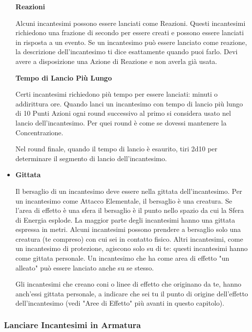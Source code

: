 \documentclass[12pt,a4paper,twoside,openany]{book}
\begin{document}
\begin{multicols}{2}
\begin{itemize}
\subitem \textbf{Reazioni}

Alcuni incantesimi possono essere lanciati come Reazioni. Questi incantesimi richiedono una frazione di secondo per essere creati e possono essere lanciati in risposta a un evento. Se un incantesimo può essere lanciato come reazione, la descrizione dell'incantesimo ti dice esattamente quando puoi farlo. Devi avere a disposizione una Azione di Reazione e non averla già usata.

\subitem \textbf{Tempo di Lancio Più Lungo}

Certi incantesimi richiedono più tempo per essere lanciati: minuti o addirittura ore. Quando lanci un incantesimo con tempo di lancio più lungo di 10 Punti Azioni ogni round successivo al primo si considera usato nel lancio dell'incantesimo. Per quei round è come se dovessi mantenere la Concentrazione.

Nel round finale, quando il tempo di lancio è esaurito, tiri 2d10 per determinare il segmento di lancio dell'incantesimo.


\item \textbf{Gittata}\label{magiegittata}

Il bersaglio di un incantesimo deve essere nella gittata dell'incantesimo. Per un incantesimo come Attacco Elementale, il bersaglio è una creatura. Se l'area di effetto è una sfera il bersaglio è il punto nello spazio da cui la Sfera di Energia esplode. La maggior parte degli incantesimi hanno una gittata espressa in metri. Alcuni incantesimi possono prendere a bersaglio solo una creatura (te compreso) con cui sei in contatto fisico. Altri incantesimi, come un incantesimo di protezione, agiscono solo su di te: questi incantesimi hanno come gittata personale. Un incantesimo che ha come area di effetto "un alleato" può essere lanciato anche su se stesso.

Gli incantesimi che creano coni o linee di effetto che originano da te, hanno anch'essi gittata personale, a indicare che sei tu il punto di origine dell'effetto dell'incantesimo (vedi "Aree di Effetto" più avanti in questo capitolo).

\end{itemize}

\subsubsection{Lanciare Incantesimi in Armatura}\label{magielanciareincantesimiinarmatura}


\end{multicols}
\end{document}
